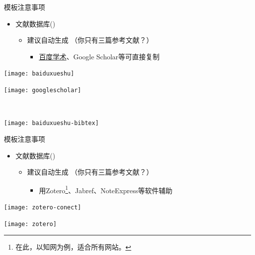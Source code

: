 \documentclass[fontset = none, xcolor=svgnames, t, aspectratio=169]{ctexbeamer}
\begin{document}
\begin{frame}{\nwafuprojrep 模板}{注意事项}
  \stretchon
  \begin{itemize}
  \item 文献数据库()
    \begin{itemize}
    \item 建议自动生成 （你只有三篇参考文献？）
      \begin{itemize}
      \item \href{http://xueshu.baidu.com/}{百度学术}、Google Scholar等可直接复制
      \end{itemize}
      
    \end{itemize}
  \end{itemize}
  \centering
  \begin{annotatedFigure}
    {\texttt{[image: baiduxueshu]}}
  \end{annotatedFigure}\quad
  \begin{annotatedFigure}
    {\texttt{[image: googlescholar]}}
  \end{annotatedFigure}\\[2ex]
  \begin{annotatedFigure}
    {\texttt{[image: baiduxueshu-bibtex]}}
  \end{annotatedFigure}
  \stretchoff
\end{frame}

\begin{frame}{\nwafuprojrep 模板}{注意事项}
  \begin{itemize}
  \item 文献数据库()
    \begin{itemize}
    \item 建议自动生成 （你只有三篇参考文献？）

      \begin{itemize}
      \item 用Zotero\footnote[frame,1]{在此，以知网为例，适合所有网站。}、Jabref、NoteExpress等软件辅助
      \end{itemize}
      
    \end{itemize}
  \end{itemize}
  \centering
  \vspace{6ex}
  \begin{annotatedFigure}
    {\texttt{[image: zotero-conect]}}
  \end{annotatedFigure}\quad%
  \begin{annotatedFigure}
    {\texttt{[image: zotero]}}
  \end{annotatedFigure}
\end{frame}
\end{document}
